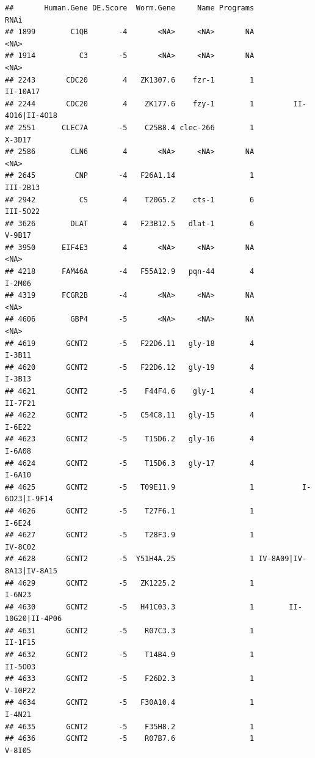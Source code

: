 \documentclass[
]{article}
\begin{document}
\begin{verbatim}
##       Human.Gene DE.Score  Worm.Gene     Name Programs                    RNAi
## 1899        C1QB       -4       <NA>     <NA>       NA                    <NA>
## 1914          C3       -5       <NA>     <NA>       NA                    <NA>
## 2243       CDC20        4   ZK1307.6    fzr-1        1                II-10A17
## 2244       CDC20        4    ZK177.6    fzy-1        1         II-4O16|II-4O18
## 2551      CLEC7A       -5    C25B8.4 clec-266        1                  X-3D17
## 2586        CLN6        4       <NA>     <NA>       NA                    <NA>
## 2645         CNP       -4   F26A1.14                 1                III-2B13
## 2942          CS        4    T20G5.2    cts-1        6                III-5O22
## 3626        DLAT        4   F23B12.5   dlat-1        6                  V-9B17
## 3950      EIF4E3        4       <NA>     <NA>       NA                    <NA>
## 4218      FAM46A       -4   F55A12.9   pqn-44        4                  I-2M06
## 4319      FCGR2B       -4       <NA>     <NA>       NA                    <NA>
## 4606        GBP4       -5       <NA>     <NA>       NA                    <NA>
## 4619       GCNT2       -5   F22D6.11   gly-18        4                  I-3B11
## 4620       GCNT2       -5   F22D6.12   gly-19        4                  I-3B13
## 4621       GCNT2       -5    F44F4.6    gly-1        4                 II-7F21
## 4622       GCNT2       -5   C54C8.11   gly-15        4                  I-6E22
## 4623       GCNT2       -5    T15D6.2   gly-16        4                  I-6A08
## 4624       GCNT2       -5    T15D6.3   gly-17        4                  I-6A10
## 4625       GCNT2       -5   T09E11.9                 1           I-6O23|I-9F14
## 4626       GCNT2       -5    T27F6.1                 1                  I-6E24
## 4627       GCNT2       -5    T28F3.9                 1                 IV-8C02
## 4628       GCNT2       -5  Y51H4A.25                 1 IV-8A09|IV-8A13|IV-8A15
## 4629       GCNT2       -5   ZK1225.2                 1                  I-6N23
## 4630       GCNT2       -5   H41C03.3                 1        II-10G20|II-4P06
## 4631       GCNT2       -5    R07C3.3                 1                 II-1F15
## 4632       GCNT2       -5    T14B4.9                 1                 II-5O03
## 4633       GCNT2       -5    F26D2.3                 1                 V-10P22
## 4634       GCNT2       -5   F30A10.4                 1                  I-4N21
## 4635       GCNT2       -5    F35H8.2                 1                        
## 4636       GCNT2       -5    R07B7.6                 1                  V-8I05

\end{verbatim}
\end{document}
